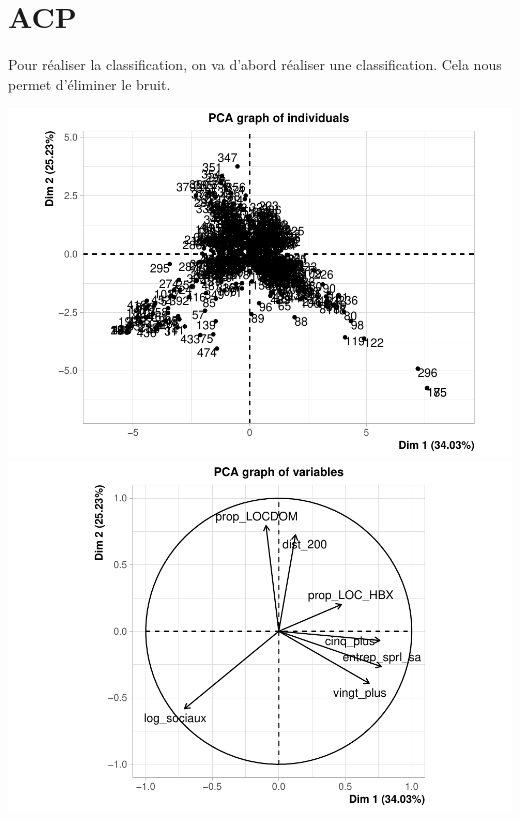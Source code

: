 \documentclass[
]{book}
\newenvironment{Shaded}{\begin{snugshade}}{\end{snugshade}}
\newcommand{\AttributeTok}[1]{\textcolor[rgb]{0.13,0.29,0.53}{#1}}
\newcommand{\ConstantTok}[1]{\textcolor[rgb]{0.56,0.35,0.01}{#1}}
\newcommand{\DecValTok}[1]{\textcolor[rgb]{0.00,0.00,0.81}{#1}}
\newcommand{\FunctionTok}[1]{\textcolor[rgb]{0.13,0.29,0.53}{\textbf{#1}}}
\newcommand{\NormalTok}[1]{#1}
\newcommand{\OtherTok}[1]{\textcolor[rgb]{0.56,0.35,0.01}{#1}}
\newcommand{\SpecialCharTok}[1]{\textcolor[rgb]{0.81,0.36,0.00}{\textbf{#1}}}
\begin{document}
\hypertarget{acp}{%
\section{ACP}\label{acp}}

Pour réaliser la classification, on va d'abord réaliser une classification. Cela nous permet d'éliminer le bruit.

\begin{Shaded}
\end{Shaded}

\includegraphics{manuel_geo_quanti_files/figure-latex/unnamed-chunk-90-1.pdf} \includegraphics{manuel_geo_quanti_files/figure-latex/unnamed-chunk-90-2.pdf}
\end{document}
